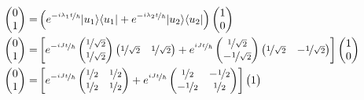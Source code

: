 \documentclass[aps]{revtex4-2}
\DeclarePairedDelimiter\bra{\langle}{\rvert}
\DeclarePairedDelimiter\ket{\lvert}{\rangle}
\begin{document}
\begin{align}
    \begin{pmatrix}
        0\\
        1
    \end{pmatrix}=&\left(e^{-\nicefrac{i\lambda_1t}{\hbar}}\ket{u_1}\bra{u_1}+e^{-\nicefrac{i\lambda_2t}{\hbar}}\ket{u_2}\bra{u_2}\right)\begin{pmatrix}
        1\\
        0
    \end{pmatrix}\nonumber\\
    \begin{pmatrix}
        0\\
        1
    \end{pmatrix}=&\left[e^{-\nicefrac{iJt}{\hbar}}\begin{pmatrix}
        \nicefrac{1}{\sqrt{2}}\\
        \nicefrac{1}{\sqrt{2}}
    \end{pmatrix}\begin{pmatrix}
        \nicefrac{1}{\sqrt{2}}&\nicefrac{1}{\sqrt{2}}
    \end{pmatrix}+e^{\nicefrac{iJt}{\hbar}}\begin{pmatrix}
        \nicefrac{1}{\sqrt{2}}\\
        -\nicefrac{1}{\sqrt{2}}
    \end{pmatrix}\begin{pmatrix}
        \nicefrac{1}{\sqrt{2}}&-\nicefrac{1}{\sqrt{2}}
    \end{pmatrix}\right]\begin{pmatrix}
        1\\
        0
    \end{pmatrix}\nonumber\\
    \begin{pmatrix}
        0\\
        1
    \end{pmatrix}=&\left[e^{-\nicefrac{iJt}{\hbar}}\begin{pmatrix}
        \nicefrac{1}{2}&\nicefrac{1}{2}\\
        \nicefrac{1}{2}&\nicefrac{1}{2}
    \end{pmatrix}+e^{\nicefrac{iJt}{\hbar}}\begin{pmatrix}
        \nicefrac{1}{2}&-\nicefrac{1}{2}\\
        -\nicefrac{1}{2}&\nicefrac{1}{2}
    \end{pmatrix}\right]\begin{pmatrix}
        1\\

\end{pmatrix}
\end{align}
\end{document}
